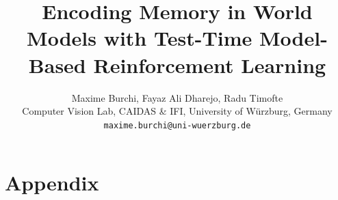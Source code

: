 \documentclass{article} %
\title{Encoding Memory in World Models with Test-Time Model-Based Reinforcement Learning}
\author{Maxime Burchi, Fayaz Ali Dharejo, Radu Timofte \\
Computer Vision Lab, CAIDAS \& IFI, University of Würzburg, Germany \\
\texttt{maxime.burchi@uni-wuerzburg.de}
}
\begin{document}
\maketitle











\newpage
\appendix
\section{Appendix}

\end{document}
